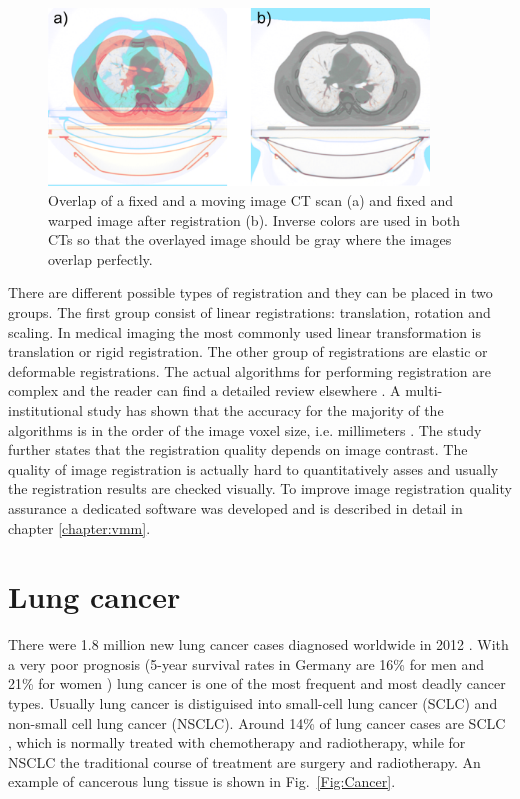\newpage
\begin{figure}[H]
\begin{center}
\includegraphics[width=0.9\textwidth]{./Fundamentals/Images/RegistrationCompare.png}
\caption{Overlap of a fixed and a moving image CT scan (a) and fixed and warped image after registration (b). Inverse colors are used in both CTs so that the overlayed image should be gray
where the images overlap perfectly.}
\label{RegistrationCompare}
\end{center}
\end{figure}

There are different possible types of registration and they can be placed in two groups. The first group consist of linear registrations: translation, rotation and scaling. In medical imaging the most commonly used linear transformation 
is translation or rigid registration. The other group of registrations are elastic or deformable registrations. The actual algorithms for performing registration are complex and the reader can
find a detailed review elsewhere \cite{Hill2001,Brock2006,Rietzel2006a}. A multi-institutional study has shown that the accuracy for the majority of the algorithms is in the order of the image voxel
size, i.e. millimeters \cite{Brock2010}. The study further states that the registration quality depends on image contrast. The quality of image registration is actually hard to quantitatively
asses and usually the registration results are checked visually. To improve image registration quality assurance a dedicated software was developed and is described in detail in chapter \ref{chapter:vmm}.

\newpage




\section{Lung cancer}

There were 1.8 million new lung cancer cases diagnosed worldwide in 2012 \cite{Worldwide2012}. With a very poor prognosis (5-year survival rates in Germany are
16\% for men and 21\% for women \cite{Kaatsch2014}) lung cancer is one of the most frequent and most deadly cancer types. Usually lung cancer is distiguised
into small-cell lung cancer (SCLC) and non-small cell lung cancer (NSCLC). Around 14\% of lung cancer cases are SCLC \cite{Tsao2008}, which is normally treated with chemotherapy and radiotherapy, while for NSCLC the traditional course of treatment
are surgery and radiotherapy. An example of cancerous lung tissue is shown in Fig.~\ref{Fig:Cancer}.

